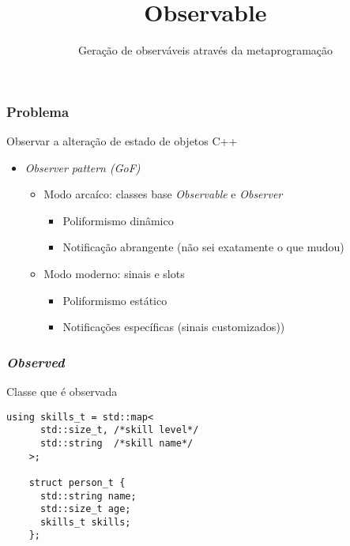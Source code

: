 \documentclass[t]{beamer}
\title{Observable}
\subtitle{Geração de observáveis através da metaprogramação}
\date{}
\begin{document}

\begin{frame}
  \titlepage
\end{frame}

\begin{frame}[fragile]
  \frametitle{Problema}
  Observar a alteração de estado de objetos C++

  \begin{itemize}
  \item<1->{\textit{Observer pattern (GoF)}}
    \begin{itemize}
    \item<2->{Modo arcaíco: classes base \textit{Observable} e \textit{Observer}}
      \begin{itemize}
      \item<3->{Poliformismo dinâmico} 
      \item<4->{Notificação abrangente (não sei exatamente o que mudou)} 
      \end{itemize}
    \item<5->{Modo moderno: sinais e slots}
      \begin{itemize}
      \item<6->{Poliformismo estático} 
      \item<7->{Notificações específicas (sinais customizados))} 
      \end{itemize}
    \end{itemize}
  \end{itemize}
\end{frame}

\begin{frame}[fragile]
  \frametitle{\textit{Observed}}
  Classe que é observada

  \begin{lstlisting}[escapeinside=`']
    using skills_t = std::map<
      std::size_t, /*skill level*/
      std::string  /*skill name*/
    >;

    struct person_t {
      std::string name;
      std::size_t age;
      skills_t skills;
    };
  \end{lstlisting}
\end{frame}
\end{document}
